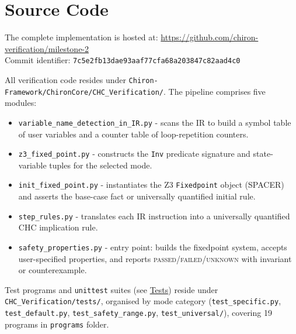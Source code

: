 \section*{Source Code}

The complete implementation is hosted at: \url{https://github.com/chiron-verification/milestone-2}
\\Commit identifier: \texttt{7c5e2fb13dae93aaf77cfa68a203847c82aad4c0}

\bigskip
\noindent
All verification code resides under \texttt{Chiron-Framework/ChironCore/CHC\_Verification/}.
The pipeline comprises five modules:

\begin{itemize}
  \item \texttt{variable\_name\_detection\_in\_IR.py} - scans the IR to build a symbol table of user variables and a counter table of loop-repetition counters.
  \item \texttt{z3\_fixed\_point.py} - constructs the \texttt{Inv} predicate signature and state-variable tuples for the selected mode.
  \item \texttt{init\_fixed\_point.py} - instantiates the Z3 \texttt{Fixedpoint} object (SPACER) and asserts the base-case fact or universally quantified initial rule.
  \item \texttt{step\_rules.py} - translates each IR instruction into a universally quantified CHC implication rule.
  \item \texttt{safety\_properties.py} - entry point: builds the fixedpoint system, accepts user-specified properties, and reports \textsc{passed}/\textsc{failed}/\textsc{unknown} with invariant or counterexample.
\end{itemize}

\noindent
Test programs and \texttt{unittest} suites (see \hyperref[sec:tests]{Tests}) reside under \texttt{CHC\_Verification/tests/}, organised by mode category (\texttt{test\_specific.py}, \texttt{test\_default.py}, \texttt{test\_safety\_range.py}, \texttt{test\_universal/}), covering 19 programs in \texttt{programs} folder.
